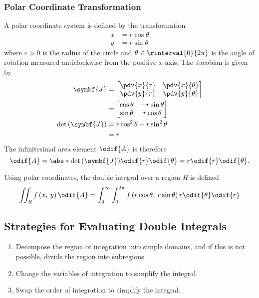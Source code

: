 \documentclass{article}
\begin{document}
\subsubsection{Polar Coordinate Transformation}
\begin{definition}
    A polar coordinate system is defined by the transformation
    \begin{align*}
        x & = r \cos{\theta} \\
        y & = r \sin{\theta}
    \end{align*}
    where \(r > 0\) is the radius of the circle and \(\theta \in \rinterval{0}{2\pi}\)
    is the angle of rotation measured anticlockwise from the positive
    \(x\)-axis.
    The Jacobian is given by
    \begin{align*}
        \symbf{J}                      & =
        \begin{bmatrix}
            \displaystyle\pdv{x}{r} & \displaystyle\pdv{x}{\theta} \\
            \displaystyle\pdv{y}{r} & \displaystyle\pdv{y}{\theta} \\
        \end{bmatrix}
        \\
                                       & =
        \begin{bmatrix}
            \cos{\theta} & -r \sin{\theta} \\
            \sin{\theta} & r \cos{\theta}  \\
        \end{bmatrix}
        \\
        \det{\left( \symbf{J} \right)} & = r \cos^2{\theta} + r \sin^2{\theta} \\
                                       & = r
    \end{align*}
    The infinitesimal area element \(\odif{A}\) is therefore
    \begin{equation*}
        \odif{A} = \abs*{\det{\left( \symbf{J} \right)}} \odif{r}\odif{\theta} = r \odif{r}\odif{\theta}.
    \end{equation*}
\end{definition}
Using polar coordinates, the double integral over a region \(R\) is
defined
\begin{equation*}
    \iint_R f\left( x,\: y \right) \odif{A} = \int_0^\infty \int_0^{2\pi} f\left( r \cos{\theta},\: r \sin{\theta} \right) r \odif{\theta} \odif{r}
\end{equation*}
\subsection{Strategies for Evaluating Double Integrals}
\begin{enumerate}
    \item Decompose the region of integration into simple domains, and
          if this is not possible, divide the region into subregions.
    \item Change the variables of integration to simplify the integral.
    \item Swap the order of integration to simplify the integral.
\end{enumerate}
\end{document}
